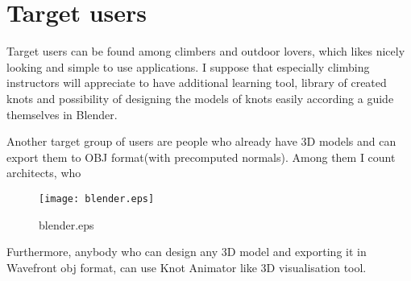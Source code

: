 \section*{Target users} %
\label{sec:Target users}
Target users can be found among climbers and outdoor lovers,
which likes nicely looking and simple to use applications.  
I suppose that especially climbing instructors will appreciate
to have additional learning tool, library of created knots and possibility 
of designing the models of knots easily according a guide themselves in Blender. 

Another target group of users are people who already have 3D models and can export them 
to OBJ format(with precomputed normals). Among them I count architects, who 
\begin{figure}
\begin{center}
\texttt{[image: blender.eps]}
\label{pic:blender.eps}
\caption{blender.eps}
\end{center}
\end{figure}

Furthermore, anybody who can design any 3D model and exporting it in Wavefront obj
format, can use Knot Animator like 3D visualisation tool.
